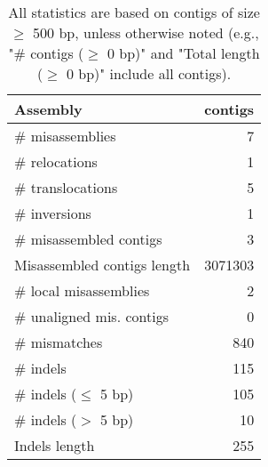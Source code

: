 \documentclass[12pt,a4paper]{article}
\begin{document}
\begin{table}[ht]
\begin{center}
\caption{All statistics are based on contigs of size $\geq$ 500 bp, unless otherwise noted (e.g., "\# contigs ($\geq$ 0 bp)" and "Total length ($\geq$ 0 bp)" include all contigs).}
\begin{tabular}{|l*{1}{|r}|}
\hline
Assembly & contigs \\ \hline
\# misassemblies & 7 \\ \hline
\hspace{5mm}\# relocations & 1 \\ \hline
\hspace{5mm}\# translocations & 5 \\ \hline
\hspace{5mm}\# inversions & 1 \\ \hline
\# misassembled contigs & 3 \\ \hline
Misassembled contigs length & 3071303 \\ \hline
\# local misassemblies & 2 \\ \hline
\# unaligned mis. contigs & 0 \\ \hline
\# mismatches & 840 \\ \hline
\# indels & 115 \\ \hline
\hspace{5mm}\# indels ($\leq$ 5 bp) & 105 \\ \hline
\hspace{5mm}\# indels ($>$ 5 bp) & 10 \\ \hline
Indels length & 255 \\ \hline
\end{tabular}
\end{center}
\end{table}
\end{document}
